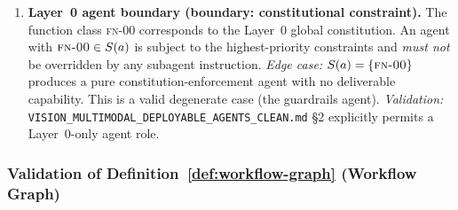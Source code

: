 \documentclass[12pt]{article}
\theoremstyle{definition}
\newcommand{\code}[1]{\texttt{#1}}
\newcommand{\FN}[1]{\textsc{fn-#1}}
\newcommand{\VisionClean}{\code{VISION\_MULTIMODAL\_\allowbreak DEPLOYABLE\_\allowbreak AGENTS\_CLEAN.md}}
\begin{document}
\begin{enumerate}[label=\textbf{A\arabic*.}, leftmargin=*, widest=A9]
  \item \textbf{Layer~0 agent boundary (boundary: constitutional
        constraint).}
        The function class \FN{00} corresponds to the Layer~0 global
        constitution.  An agent with $\FN{00} \in S(a)$ is subject to
        the highest-priority constraints and \emph{must not} be
        overridden by any subagent instruction.
        \emph{Edge case:} $S(a) = \{\FN{00}\}$ produces a pure
        constitution-enforcement agent with no deliverable capability.
        This is a valid degenerate case (the guardrails agent).
        \emph{Validation:} \VisionClean{} \S2 explicitly permits a
        Layer~0-only agent role.

\end{enumerate}

\subsubsection{Validation of Definition~\ref{def:workflow-graph}
               (Workflow Graph)}
\label{sec:val-workflow}
\end{document}
